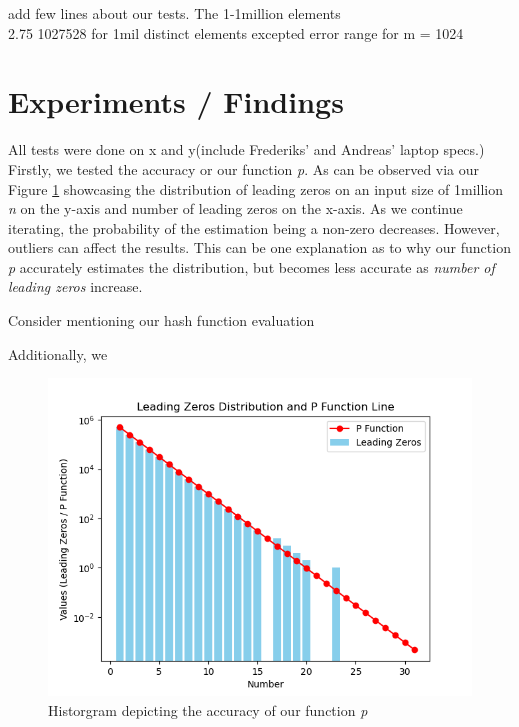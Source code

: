 \documentclass{article}
\begin{document}
add few lines about our tests. The 1-1million elements
\\

2.75%
1027528 for 1mil distinct elements
excepted error range for m = 1024

\section{Experiments / Findings}
All tests were done on x and y(include Frederiks' and Andreas' laptop specs.)
Firstly, we tested the accuracy or our function \textit{p}. As can be observed via our Figure \ref{fig:functionP} showcasing the distribution of leading zeros on an input size of 1million \textit{n}  on the y-axis and number of leading zeros on the x-axis. As we continue iterating, the probability of the estimation being a non-zero decreases. However, outliers can affect the results. This can be one explanation as to why our function \textit{p} accurately estimates the distribution, but becomes less accurate as \textit{number of leading zeros} increase.

Consider mentioning our hash function evaluation

Additionally, we 





\begin{figure} [hbt!]
    \centering
    \includegraphics[width=\textwidth]{QualityTestHistogram.png}
    \caption{Historgram depicting the accuracy of our function \textit{p}}
    \label{fig:functionP} 
\end{figure}
\end{document}
